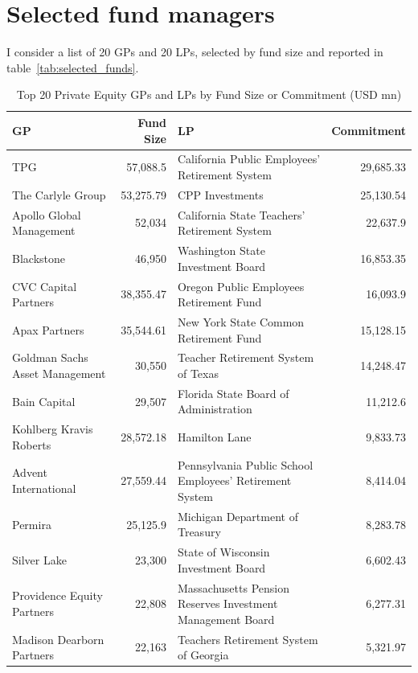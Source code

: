 \section{Selected fund managers}\label{sec:selected-fund-managers}

    I consider a list of 20 GPs and 20 LPs, selected by fund size and reported in table~\ref{tab:selected_funds}.

    \begin{table}
    \centering
    \caption{Top 20 Private Equity GPs and LPs by Fund Size or Commitment (USD mn)}
    \begin{tabular}{l r | l r}
    \hline
    \textbf{GP} & \textbf{Fund Size} & \textbf{LP} & \textbf{Commitment} \\
    \hline
    TPG & 57,088.5 & California Public Employees' Retirement System & 29,685.33 \\
    The Carlyle Group & 53,275.79 & CPP Investments & 25,130.54 \\
    Apollo Global Management & 52,034 & California State Teachers' Retirement System & 22,637.9 \\
    Blackstone & 46,950 & Washington State Investment Board & 16,853.35 \\
    CVC Capital Partners & 38,355.47 & Oregon Public Employees Retirement Fund & 16,093.9 \\
    Apax Partners & 35,544.61 & New York State Common Retirement Fund & 15,128.15 \\
    Goldman Sachs Asset Management & 30,550 & Teacher Retirement System of Texas & 14,248.47 \\
    Bain Capital & 29,507 & Florida State Board of Administration & 11,212.6 \\
    Kohlberg Kravis Roberts & 28,572.18 & Hamilton Lane & 9,833.73 \\
    Advent International & 27,559.44 & Pennsylvania Public School Employees' Retirement System & 8,414.04 \\
    Permira & 25,125.9 & Michigan Department of Treasury & 8,283.78 \\
    Silver Lake & 23,300 & State of Wisconsin Investment Board & 6,602.43 \\
    Providence Equity Partners & 22,808 & Massachusetts Pension Reserves Investment Management Board & 6,277.31 \\
    Madison Dearborn Partners & 22,163 & Teachers Retirement System of Georgia & 5,321.97 \\

\end{tabular}
\end{table}
